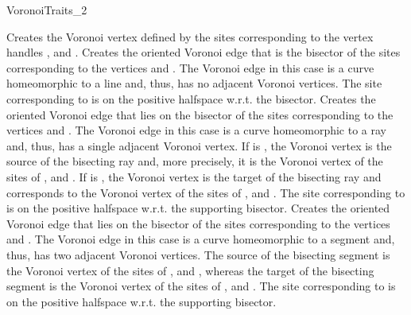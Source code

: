 \begin{ccRefConcept}{VoronoiTraits_2}



\ccGlue
{}

%
%
%
\ccThreeToTwo
{}
{Creates the Voronoi vertex defined by the sites corresponding to the
  vertex handles ,  and .}
\ccGlue
{}
{Creates the oriented Voronoi edge that is the bisector of the sites
  corresponding to the vertices  and . The Voronoi
  edge in this case is a curve homeomorphic to a line and, thus, has
  no adjacent Voronoi vertices. The site corresponding to  is
  on the positive halfspace w.r.t. the bisector.}
\ccGlue
{}
{Creates the oriented Voronoi edge that lies on the bisector of the sites
  corresponding to the vertices  and . The Voronoi
  edge in this case is a curve homeomorphic to a ray and, thus, has
  a single adjacent Voronoi vertex. If  is ,
  the Voronoi vertex is the source of the bisecting ray and, more precisely,
  it is the Voronoi vertex of the sites of ,  and
  . If  is , the Voronoi vertex is
  the target of the bisecting ray and corresponds to the Voronoi
  vertex of the sites of ,  and . The site
  corresponding to  is on the positive halfspace w.r.t. the
  supporting bisector.}
\ccGlue
{}
{Creates the oriented Voronoi edge that lies on the bisector of the sites
  corresponding to the vertices  and . The Voronoi
  edge in this case is a curve homeomorphic to a segment and, thus, has
  two adjacent Voronoi vertices. The source of the bisecting segment
  is the Voronoi vertex of the sites of ,  and
  , whereas the target of the bisecting segment is the Voronoi
  vertex of the sites of ,  and . The site
  corresponding to  is on the positive halfspace w.r.t. the
  supporting bisector.}


\end{ccRefConcept}
